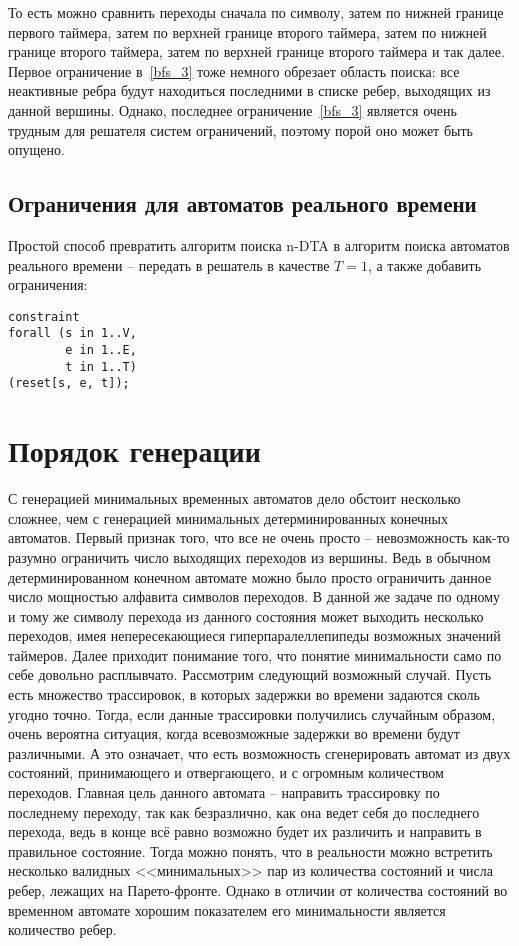 \documentclass[times,specification,annotation]{itmo-student-thesis}
\begin{document}
То есть можно сравнить переходы сначала по символу, затем по нижней границе первого таймера, затем по верхней границе второго таймера, затем по нижней границе второго таймера, затем
по верхней границе второго таймера и так далее. Первое ограничение в~\ref{bfs_3} тоже немного обрезает область поиска: все неактивные ребра будут находиться последними в списке ребер,
выходящих из данной вершины. Однако, последнее ограничение~\ref{bfs_3} является очень трудным для решателя систем ограничений, поэтому порой оно может быть опущено.

\subsection{Ограничения для автоматов реального времени}

Простой способ превратить алгоритм поиска n-DTA в алгоритм поиска автоматов реального времени -- передать в решатель в качестве $T = 1$, а также добавить ограничения:

\begin{lstlisting}[float=!h,language=Mzn,caption={Ограничения RTA},label={rta_constraints}]
constraint
forall (s in 1..V,
        e in 1..E,
        t in 1..T)
(reset[s, e, t]);
\end{lstlisting}

\section{Порядок генерации}
С генерацией минимальных временных автоматов дело обстоит несколько сложнее, чем с генерацией минимальных детерминированных конечных автоматов.
Первый признак того, что все не очень просто -- невозможность как-то разумно ограничить число выходящих переходов из вершины. Ведь в обычном детерминированном конечном автомате можно
было просто ограничить данное число мощностью алфавита символов переходов. В данной же задаче по одному и тому же символу перехода из данного состояния может выходить несколько
переходов, имея непересекающиеся гиперпаралеллепипеды возможных значений таймеров.
Далее приходит понимание того, что понятие минимальности само по себе довольно расплывчато. Рассмотрим следующий возможный случай. 
Пусть есть множество трассировок, в которых задержки во времени задаются сколь угодно точно. Тогда, если данные трассировки получились случайным образом,
очень вероятна ситуация, когда всевозможные задержки во времени будут различными. А это означает, что есть возможность сгенерировать автомат из двух состояний, принимающего и отвергающего,
и с огромным количеством переходов. Главная цель данного автомата -- направить трассировку по последнему переходу, так как безразлично, как она ведет себя до последнего перехода, ведь в
конце всё равно возможно будет их различить и направить в правильное состояние. Тогда можно понять, что в реальности можно встретить несколько валидных <<минимальных>> пар из количества
состояний и числа ребер, лежащих на Парето-фронте. 
Однако в отличии от количества состояний во временном автомате хорошим показателем его минимальности является количество ребер.
\end{document}
